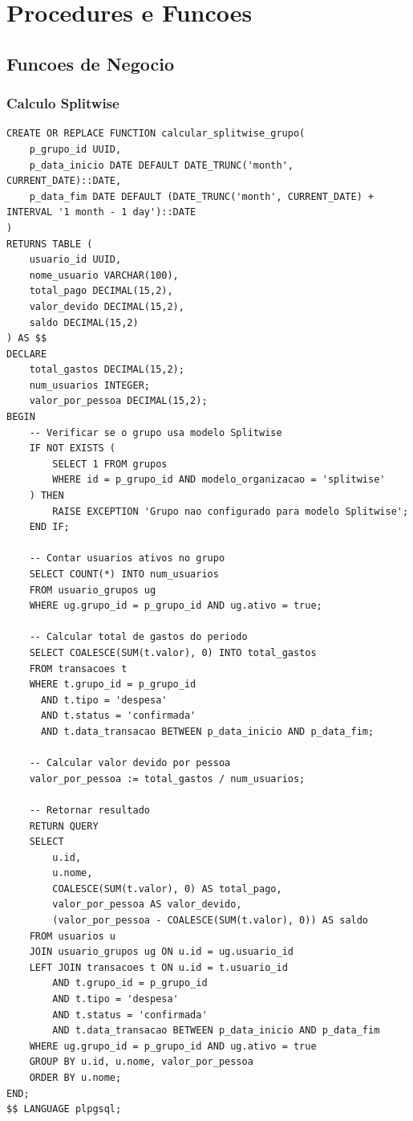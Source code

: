 \section{Procedures e Funcoes}

\subsection{Funcoes de Negocio}

\subsubsection{Calculo Splitwise}

\begin{lstlisting}[caption=Funcao para calcular divisao Splitwise]
CREATE OR REPLACE FUNCTION calcular_splitwise_grupo(
    p_grupo_id UUID,
    p_data_inicio DATE DEFAULT DATE_TRUNC('month', CURRENT_DATE)::DATE,
    p_data_fim DATE DEFAULT (DATE_TRUNC('month', CURRENT_DATE) + INTERVAL '1 month - 1 day')::DATE
)
RETURNS TABLE (
    usuario_id UUID,
    nome_usuario VARCHAR(100),
    total_pago DECIMAL(15,2),
    valor_devido DECIMAL(15,2),
    saldo DECIMAL(15,2)
) AS $$
DECLARE
    total_gastos DECIMAL(15,2);
    num_usuarios INTEGER;
    valor_por_pessoa DECIMAL(15,2);
BEGIN
    -- Verificar se o grupo usa modelo Splitwise
    IF NOT EXISTS (
        SELECT 1 FROM grupos 
        WHERE id = p_grupo_id AND modelo_organizacao = 'splitwise'
    ) THEN
        RAISE EXCEPTION 'Grupo nao configurado para modelo Splitwise';
    END IF;
    
    -- Contar usuarios ativos no grupo
    SELECT COUNT(*) INTO num_usuarios
    FROM usuario_grupos ug
    WHERE ug.grupo_id = p_grupo_id AND ug.ativo = true;
    
    -- Calcular total de gastos do periodo
    SELECT COALESCE(SUM(t.valor), 0) INTO total_gastos
    FROM transacoes t
    WHERE t.grupo_id = p_grupo_id
      AND t.tipo = 'despesa'
      AND t.status = 'confirmada'
      AND t.data_transacao BETWEEN p_data_inicio AND p_data_fim;
    
    -- Calcular valor devido por pessoa
    valor_por_pessoa := total_gastos / num_usuarios;
    
    -- Retornar resultado
    RETURN QUERY
    SELECT 
        u.id,
        u.nome,
        COALESCE(SUM(t.valor), 0) AS total_pago,
        valor_por_pessoa AS valor_devido,
        (valor_por_pessoa - COALESCE(SUM(t.valor), 0)) AS saldo
    FROM usuarios u
    JOIN usuario_grupos ug ON u.id = ug.usuario_id
    LEFT JOIN transacoes t ON u.id = t.usuario_id 
        AND t.grupo_id = p_grupo_id
        AND t.tipo = 'despesa'
        AND t.status = 'confirmada'
        AND t.data_transacao BETWEEN p_data_inicio AND p_data_fim
    WHERE ug.grupo_id = p_grupo_id AND ug.ativo = true
    GROUP BY u.id, u.nome, valor_por_pessoa
    ORDER BY u.nome;
END;
$$ LANGUAGE plpgsql;
\end{lstlisting}

